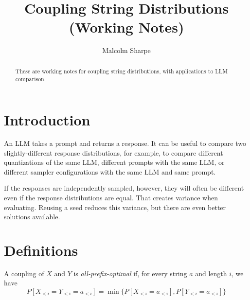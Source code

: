 \documentclass{article}
\title{Coupling String Distributions (Working Notes)}
\author{Malcolm Sharpe}
\begin{document}
\maketitle

\begin{abstract}
These are working notes for coupling string distributions,
with applications to LLM comparison.
\end{abstract}

\section{Introduction}
An LLM takes a prompt and returns a response.
It can be useful to compare two slightly-different response distributions,
for example, to compare different quantizations of the same LLM,
different prompts with the same LLM,
or different sampler configurations with the same LLM and same prompt.

If the responses are independently sampled, however,
they will often be different even if the response distributions are equal.
That creates variance when evaluating.
Reusing a seed reduces this variance,
but there are even better solutions available.

\section{Definitions}

A coupling of $X$ and $Y$ is \textit{all-prefix-optimal} if,
for every string $a$ and length $i$, we have
\[
P\left[X_{<i} = Y_{<i} = a_{<i}\right] = \min \big\{ P\left[X_{<i} = a_{<i}\right], P\left[Y_{<i} = a_{<i}\right] \big\}
\]
\end{document}
